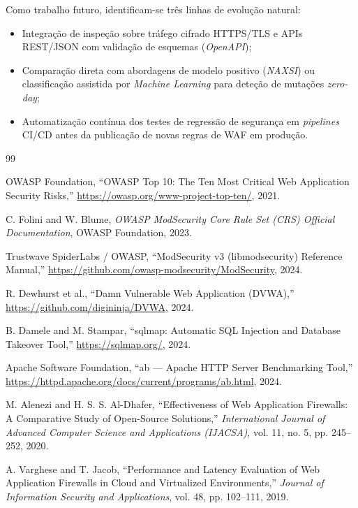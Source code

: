 \documentclass[11pt,a4paper]{article}
\begin{document}
Como trabalho futuro, identificam-se três linhas de evolução natural:
\begin{itemize}
    \item Integração de inspeção sobre tráfego cifrado HTTPS/TLS e APIs REST/JSON com validação de esquemas (\textit{OpenAPI});
    \item Comparação direta com abordagens de modelo positivo (\textit{NAXSI}) ou classificação assistida por \textit{Machine Learning} para deteção de mutações \textit{zero-day};
    \item Automatização contínua dos testes de regressão de segurança em \textit{pipelines} CI/CD antes da publicação de novas regras de WAF em produção.
\end{itemize}

\clearpage
\begin{thebibliography}{99}

OWASP Foundation, ``OWASP Top 10: The Ten Most Critical Web Application Security Risks,'' \url{https://owasp.org/www-project-top-ten/}, 2021.

C. Folini and W. Blume, \textit{OWASP ModSecurity Core Rule Set (CRS) Official Documentation}, OWASP Foundation, 2023.

Trustwave SpiderLabs / OWASP, ``ModSecurity v3 (libmodsecurity) Reference Manual,'' \url{https://github.com/owasp-modsecurity/ModSecurity}, 2024.

R. Dewhurst et al., ``Damn Vulnerable Web Application (DVWA),'' \url{https://github.com/digininja/DVWA}, 2024.

B. Damele and M. Stampar, ``sqlmap: Automatic SQL Injection and Database Takeover Tool,'' \url{https://sqlmap.org/}, 2024.

Apache Software Foundation, ``ab --- Apache HTTP Server Benchmarking Tool,'' \url{https://httpd.apache.org/docs/current/programs/ab.html}, 2024.

M. Alenezi and H. S. S. Al-Dhafer, ``Effectiveness of Web Application Firewalls: A Comparative Study of Open-Source Solutions,'' \textit{International Journal of Advanced Computer Science and Applications (IJACSA)}, vol. 11, no. 5, pp. 245--252, 2020.

A. Varghese and T. Jacob, ``Performance and Latency Evaluation of Web Application Firewalls in Cloud and Virtualized Environments,'' \textit{Journal of Information Security and Applications}, vol. 48, pp. 102--111, 2019.

\end{thebibliography}
\end{document}

